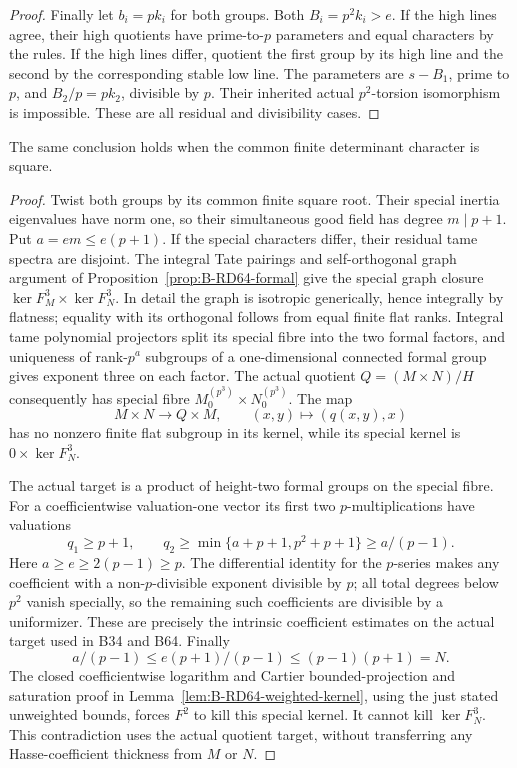 \begin{proof}
Finally let \(b_i=pk_i\) for both groups. Both
\(B_i=p^2k_i>e\). If the high lines agree, their high quotients
have prime-to-\(p\) parameters and equal characters by the rules.
If the high lines differ, quotient the first group by its
high line and the second by the corresponding stable low line.
The parameters are \(s-B_1\), prime to \(p\), and
\(B_2/p=pk_2\), divisible by \(p\). Their inherited actual
\(p^2\)-torsion isomorphism is impossible. These are all
residual and divisibility cases.
\end{proof}

\begin{lemma}
\label{lem:B-RD68-square}
The same conclusion holds when the common finite determinant
character is square.
\end{lemma}
\begin{proof}
Twist both groups by its common finite square root.
Their special inertia eigenvalues have norm one, so their
simultaneous good field has degree \(m\mid p+1\).
Put \(a=e m\le e(p+1)\).
If the special characters differ, their residual tame spectra
are disjoint. The integral Tate pairings and self-orthogonal
graph argument of Proposition~\ref{prop:B-RD64-formal} give
the special graph closure
\(\ker F_M^3\times\ker F_N^3\).
In detail the graph is isotropic generically, hence integrally
by flatness; equality with its orthogonal follows from equal
finite flat ranks. Integral tame polynomial projectors split
its special fibre into the two formal factors, and uniqueness
of rank-\(p^a\) subgroups of a one-dimensional connected formal
group gives exponent three on each factor.
The actual quotient \(Q=(M\times N)/H\) consequently has
special fibre \(M_0^{(p^3)}\times N_0^{(p^3)}\).
The map
\[
 M\times N\longrightarrow Q\times M,\qquad
 (x,y)\longmapsto(q(x,y),x)
\]
has no nonzero finite flat subgroup in its kernel, while its
special kernel is \(0\times\ker F_N^3\).

The actual target is a product of height-two formal groups
on the special fibre. For a coefficientwise valuation-one
vector its first two \(p\)-multiplications have valuations
\[
 q_1\ge p+1,\qquad
 q_2\ge\min\{a+p+1,p^2+p+1\}\ge a/(p-1).
 \tag{B-RD68.10}
\]
Here \(a\ge e\ge2(p-1)\ge p\).
The differential identity for the \(p\)-series makes any
coefficient with a non-\(p\)-divisible exponent divisible by \(p\);
all total degrees below \(p^2\) vanish specially, so the
remaining such coefficients are divisible by a uniformizer.
These are precisely the intrinsic coefficient estimates on
the actual target used in B34 and B64.
Finally
\[
 a/(p-1)\le e(p+1)/(p-1)\le(p-1)(p+1)=N .
 \tag{B-RD68.11}
\]
The closed coefficientwise logarithm and Cartier bounded-projection
and saturation proof in Lemma~\ref{lem:B-RD64-weighted-kernel},
using the just stated unweighted bounds, forces \(F^2\) to
kill this special kernel. It cannot kill \(\ker F_N^3\).
This contradiction uses the actual quotient target, without
transferring any Hasse-coefficient thickness from \(M\) or \(N\).
\end{proof}

